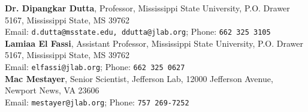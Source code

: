 \documentclass[10pt, letterpaper]{article}
\begin{document}
\textbf{Dr. Dipangkar Dutta}, Professor, Mississippi State University, P.O. Drawer 5167, Mississippi State, MS 39762 \\
Email: \texttt{d.dutta@msstate.edu, ddutta@jlab.org}; Phone: \texttt{662 325 3105}\\

\textbf{Lamiaa El Fassi}, Assistant Professor, Mississippi State University, P.O. Drawer 5167, Mississippi State, MS 39762 \\
Email: \texttt{elfassi@jlab.org}; Phone: \texttt{662 325 0627}\\

\textbf{Mac Mestayer}, Senior Scientist,  Jefferson Lab, 12000 Jefferson Avenue, Newport News, VA 23606 \\
Email: \texttt{mestayer@jlab.org}; Phone: \texttt{757 269-7252 }\\
\end{document}
